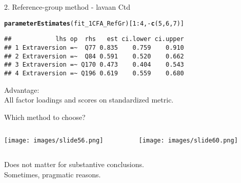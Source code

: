 \documentclass[10pt]{beamer}\usepackage[]{graphicx}\usepackage[]{xcolor}
\makeatletter
\newcommand{\hlnum}[1]{\textcolor[rgb]{0.686,0.059,0.569}{#1}}%
\newcommand{\hlopt}[1]{\textcolor[rgb]{0,0,0}{#1}}%
\newcommand{\hldef}[1]{\textcolor[rgb]{0.345,0.345,0.345}{#1}}%
\newcommand{\hlkwd}[1]{\textcolor[rgb]{0.737,0.353,0.396}{\textbf{#1}}}%
\newenvironment{kframe}{%
 \def\at@end@of@kframe{}%
 \ifinner\ifhmode%
  \def\at@end@of@kframe{\end{minipage}}%
  \begin{minipage}{\columnwidth}%
 \fi\fi%
 \def\FrameCommand##1{\hskip\@totalleftmargin \hskip-\fboxsep
 \colorbox{shadecolor}{##1}\hskip-\fboxsep
     \hskip-\linewidth \hskip-\@totalleftmargin \hskip\columnwidth}%
 \MakeFramed {\advance\hsize-\width
   \@totalleftmargin\z@ \linewidth\hsize
   \@setminipage}}%
 {\par\unskip\endMakeFramed%
 \at@end@of@kframe}
\newenvironment{knitrout}{}{} %
\makeatother
\begin{document}
\begin{frame}[fragile]{2. Reference-group method - lavaan Ctd}

\begin{knitrout}
\color{fgcolor}\begin{kframe}
\begin{alltt}
\hlkwd{parameterEstimates}\hldef{(fit_1CFA_RefGr)[}\hlnum{1}\hlopt{:}\hlnum{4}\hldef{,}\hlopt{-}\hlkwd{c}\hldef{(}\hlnum{5}\hldef{,}\hlnum{6}\hldef{,}\hlnum{7}\hldef{)]}
\end{alltt}
\begin{verbatim}
##            lhs op  rhs   est ci.lower ci.upper
## 1 Extraversion =~  Q77 0.835    0.759    0.910
## 2 Extraversion =~  Q84 0.591    0.520    0.662
## 3 Extraversion =~ Q170 0.473    0.404    0.543
## 4 Extraversion =~ Q196 0.619    0.559    0.680
\end{verbatim}
\end{kframe}
\end{knitrout}

Advantage:\\ 
All factor loadings and scores on standardized metric. 

\end{frame}
%
\begin{frame}{Which method to choose?}


\begin{columns}[T] %
    \begin{column}{.49\textwidth}
    
    {}
    \texttt{[image: images/slide56.png]}
    
    \end{column}%
    
    \hfill%
    \begin{column}{.49\textwidth}
    
    {}
        \texttt{[image: images/slide60.png]}
    \end{column}%
    
    \end{columns}
    
Does not matter for substantive conclusions.\\
Sometimes, pragmatic reasons. 

\end{frame}
\end{document}
